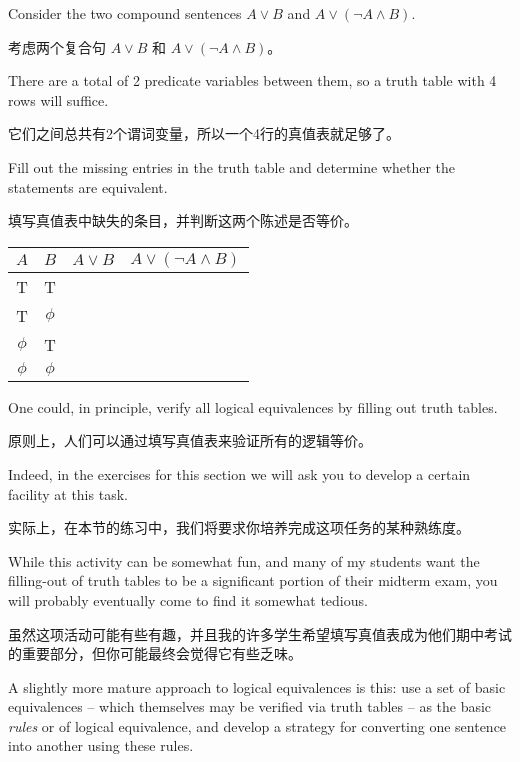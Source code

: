 \begin{exer} 
Consider the two compound sentences $A \lor B$ and $A \lor ({\lnot}A \land B)$.

考虑两个复合句 $A \lor B$ 和 $A \lor ({\lnot}A \land B)$。

There are a total of 2 predicate variables between them, so a truth table
with 4 rows will suffice.

它们之间总共有2个谓词变量，所以一个4行的真值表就足够了。

Fill out the missing entries in the truth
table and determine whether the statements are equivalent.

填写真值表中缺失的条目，并判断这两个陈述是否等价。

\begin{center}
\begin{tabular}{c|c||c|c}
\; $A$ \; & \; $B$ \; & \; $A \lor B$ \; & \; $A \lor ({\lnot}A \land B)$\; \\ \hline
T & T &  & \\
T & $\phi$ & & \\
 $\phi$ & T & &  \\
 $\phi$ &  $\phi$  & &\\
\end{tabular}
\end{center}

\end{exer}

One could, in principle, verify all logical equivalences by filling out
truth tables.

原则上，人们可以通过填写真值表来验证所有的逻辑等价。

Indeed, in the exercises for this section we will ask you
to develop a certain facility at this task.

实际上，在本节的练习中，我们将要求你培养完成这项任务的某种熟练度。

While this activity can
be somewhat fun, and many of my students want the filling-out of truth 
tables to
be a significant portion of their midterm exam, you will probably eventually
come to find it somewhat tedious.

虽然这项活动可能有些有趣，并且我的许多学生希望填写真值表成为他们期中考试的重要部分，但你可能最终会觉得它有些乏味。

A slightly more mature approach to logical
equivalences is this: use a set of basic equivalences -- which themselves
may be verified via truth tables -- as the basic {\em rules} or 
of logical equivalence, and develop a strategy for converting one
sentence into another using these rules.

